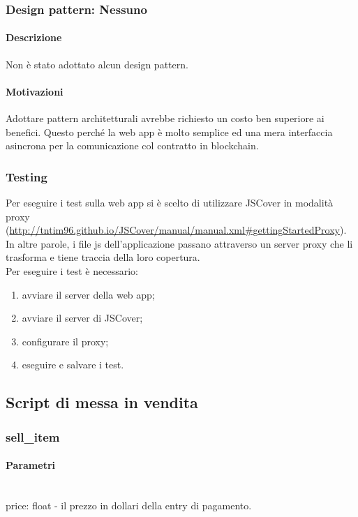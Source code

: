 \documentclass[a4paper, 12pt]{article}
\begin{document}
\subsubsection{Design pattern: Nessuno}
\paragraph{Descrizione}
Non è stato adottato alcun design pattern.
\paragraph{Motivazioni}
Adottare pattern architetturali avrebbe richiesto un costo ben superiore ai benefici. Questo perché la web app è molto semplice ed una mera interfaccia asincrona per la comunicazione col contratto in blockchain.
\subsubsection{Testing}
Per eseguire i test sulla web app si è scelto di utilizzare JSCover in modalità proxy (\href{http://tntim96.github.io/JSCover/manual/manual.xml#gettingStartedProxy}{http://tntim96.github.io/JSCover/manual/manual.xml\#gettingStartedProxy}). \\
In altre parole, i file js dell'applicazione passano attraverso un server proxy che li trasforma e tiene traccia della loro copertura. \\
Per eseguire i test è necessario:
\begin{enumerate}
    \item avviare il server della web app;
    \item avviare il server di JSCover;
    \item configurare il proxy;
    \item eseguire e salvare i test.
\end{enumerate}

\subsection{Script di messa in vendita}
\subsubsection{sell\_item}
\paragraph{Parametri}\\
price: float - il prezzo in dollari della entry di pagamento.
\end{document}
